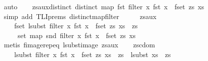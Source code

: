 \begin{isabellebody}
\ auto\isanewline
\ \ \isamarkupfalse%
\ zs{\isacharunderscore}{\kern0pt}aux{\isacharunderscore}{\kern0pt}distinct{\isacharcolon}{\kern0pt}\ {\isachardoublequoteopen}distinct\ {\isacharparenleft}{\kern0pt}map\ fst\ {\isacharparenleft}{\kern0pt}{\isacharparenleft}{\kern0pt}filter\ {\isacharparenleft}{\kern0pt}{\isasymlambda}x{\isachardot}{\kern0pt}\ fst\ x\ {\isasymin}\ fset\ zs{\isacharparenright}{\kern0pt}\ xs{\isacharparenright}{\kern0pt}{\isacharparenright}{\kern0pt}{\isacharparenright}{\kern0pt}{\isachardoublequoteclose}\isanewline
\ \ \ \ \isamarkupfalse%
\ {\isacharparenleft}{\kern0pt}simp\ add{\isacharcolon}{\kern0pt}\ TLI{\isachardot}{\kern0pt}prems{\isacharparenleft}{\kern0pt}{}{\isacharparenright}{\kern0pt}\ distinct{\isacharunderscore}{\kern0pt}map{\isacharunderscore}{\kern0pt}filter{\isacharparenright}{\kern0pt}\isanewline
\ \ \isamarkupfalse%
\ \isamarkupfalse%
\ zs{\isacharunderscore}{\kern0pt}aux{}{\isacharcolon}{\kern0pt}\isanewline
\ \ \ \ {\isachardoublequoteopen}fset\ {\isacharparenleft}{\kern0pt}{\isacharparenleft}{\kern0pt}lsubst\ {\isacharparenleft}{\kern0pt}filter\ {\isacharparenleft}{\kern0pt}{\isasymlambda}x{\isachardot}{\kern0pt}\ fst\ x\ {\isasymin}\ fset\ zs{\isacharparenright}{\kern0pt}\ xs{\isacharparenright}{\kern0pt}{\isacharparenright}{\kern0pt}\ {\isacharbar}{\kern0pt}{\isacharbackquote}{\kern0pt}{\isacharbar}{\kern0pt}\ zs{\isacharparenright}{\kern0pt}\ {\isacharequal}{\kern0pt}\isanewline
\ \ \ \ \ set\ {\isacharparenleft}{\kern0pt}map\ snd\ {\isacharparenleft}{\kern0pt}filter\ {\isacharparenleft}{\kern0pt}{\isasymlambda}x{\isachardot}{\kern0pt}\ fst\ x\ {\isasymin}\ fset\ zs{\isacharparenright}{\kern0pt}\ xs{\isacharparenright}{\kern0pt}{\isacharparenright}{\kern0pt}{\isachardoublequoteclose}\isanewline
\ \ \ \ \isamarkupfalse%
\ {\isacharparenleft}{\kern0pt}metis\ fimage{\isachardot}{\kern0pt}rep{\isacharunderscore}{\kern0pt}eq\ lsubst{\isacharunderscore}{\kern0pt}image\ zs{\isacharunderscore}{\kern0pt}aux{}{\isacharparenright}{\kern0pt}\isanewline
\ \ \isamarkupfalse%
\ zs{\isacharunderscore}{\kern0pt}cdom{}{\isacharcolon}{\kern0pt}\isanewline
\ \ \ \ {\isachardoublequoteopen}{\isacharparenleft}{\kern0pt}lsubst\ {\isacharparenleft}{\kern0pt}filter\ {\isacharparenleft}{\kern0pt}{\isasymlambda}x{\isachardot}{\kern0pt}\ fst\ x\ {\isasymin}\ fset\ zs{\isacharparenright}{\kern0pt}\ xs{\isacharparenright}{\kern0pt}{\isacharparenright}{\kern0pt}\ {\isacharbar}{\kern0pt}{\isacharbackquote}{\kern0pt}{\isacharbar}{\kern0pt}\ zs\ {\isacharequal}{\kern0pt}\ {\isacharparenleft}{\kern0pt}lsubst\ xs{\isacharparenright}{\kern0pt}\ {\isacharbar}{\kern0pt}{\isacharbackquote}{\kern0pt}{\isacharbar}{\kern0pt}\ zs{\isachardoublequoteclose}\isanewline

\end{isabellebody}
